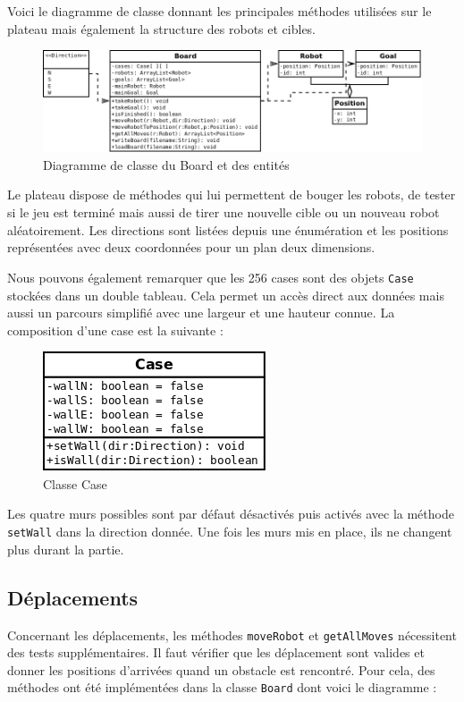 \documentclass[a4paper]{article} %
\begin{document}
Voici le diagramme de classe donnant les principales méthodes utilisées sur le plateau mais également la structure des robots et cibles.
\pagebreak
\begin{figure}[!h]
	\begin{center}
	\includegraphics[scale=0.5]{./images/boardwithentities.png}
	\caption{Diagramme de classe du Board et des entités}
	\end{center}
\end{figure}

Le plateau dispose de méthodes qui lui permettent de bouger les robots, de tester si le jeu est terminé mais aussi de tirer une nouvelle cible ou un nouveau robot aléatoirement. Les directions sont listées depuis une énumération et les positions représentées avec deux coordonnées pour un plan deux dimensions.

Nous pouvons également remarquer que les 256 cases sont des objets \texttt{Case} stockées dans un double tableau. Cela permet un accès direct aux données mais aussi un parcours simplifié avec une largeur et une hauteur connue. La composition d'une case est la suivante :
\begin{figure}[htpb]
	\begin{center}
	\includegraphics[scale=0.5]{./images/casediag.png}
	\caption{Classe Case}
	\end{center}
\end{figure}

Les quatre murs possibles sont par défaut désactivés puis activés avec la méthode \texttt{setWall} dans la direction donnée. Une fois les murs mis en place, ils ne changent plus durant la partie.%

	\subsection{Déplacements}
Concernant les déplacements, les méthodes \texttt{moveRobot} et \texttt{getAllMoves} nécessitent des tests supplémentaires. Il faut vérifier que les déplacement sont valides et donner les positions d'arrivées quand un obstacle est rencontré. Pour cela, des méthodes ont été implémentées dans la classe \texttt{Board} dont voici le diagramme :
\end{document}
